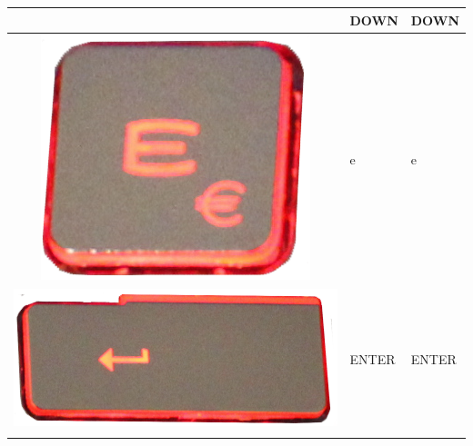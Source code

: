 \begin{longtable}{|cll|}
\begin{minipage}[c]{.3\textwidth}
\vspace{0.2cm}
\end{minipage} & DOWN & DOWN\\
\hline
\begin{minipage}[c]{.3\textwidth}
\vspace{0.2cm}
\includegraphics[scale=0.06]{Images/KeyMapping/e}
\vspace{0.2cm}
\end{minipage} & e & e\\
\hline
\begin{minipage}[c]{.3\textwidth}
\vspace{0.2cm}
\includegraphics[scale=0.06]{Images/KeyMapping/ENTER}
\vspace{0.2cm}
\end{minipage} & ENTER & ENTER\\
\hline
\begin{minipage}[c]{.3\textwidth}
\vspace{0.2cm}

\end{minipage}
\end{longtable}
